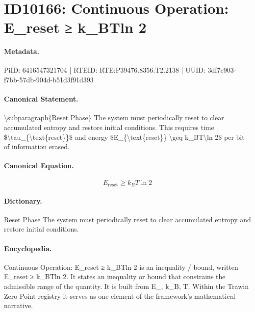 \section*{ID10166: Continuous Operation: E\_reset ≥ k\_BTln 2}
\paragraph{Metadata.}
PiID: 6416547321704 | RTEID: RTE:P39476.8356:T2.2138 | UUID: 3df7c903-f7bb-57db-904d-b51d3f91d393

\paragraph{Canonical Statement.}
\textbackslash{}subparagraph\{Reset Phase\} The system must periodically reset to clear accumulated entropy and restore initial conditions. This requires time \$\textbackslash{}tau\_\{\textbackslash{}text\{reset\}\}\$ and energy \$E\_\{\textbackslash{}text\{reset\}\} \textbackslash{}geq k\_BT\textbackslash{}ln 2\$ per bit of information erased.

\paragraph{Canonical Equation.}
\[
E_{\text{reset}} \geq k_BT\ln 2
\]

\paragraph{Dictionary.}
Reset Phase The system must periodically reset to clear accumulated entropy and restore initial conditions.

\paragraph{Encyclopedia.}
Continuous Operation: E\_reset ≥ k\_BTln 2 is an inequality / bound, written E\_reset ≥ k\_BTln 2. It states an inequality or bound that constrains the admissible range of the quantity. It is built from E\_, k\_B, T. Within the Trawin Zero Point registry it serves as one element of the framework's mathematical narrative.
